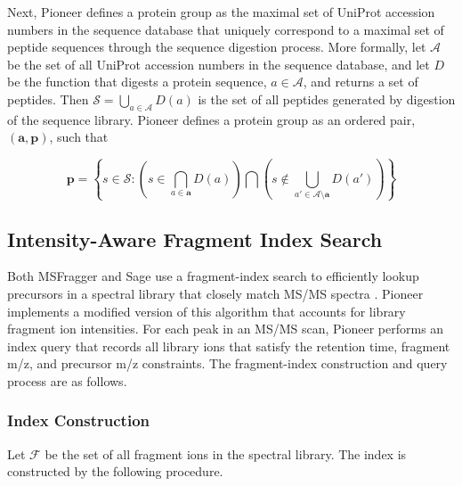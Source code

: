 \documentclass[pdflatex,sn-nature]{sn-jnl}
\begin{document}
Next, Pioneer defines a protein group as the maximal set of UniProt accession numbers in the sequence database that uniquely correspond to a maximal set of peptide sequences through the sequence digestion process. More formally, let $\mathcal{A}$ be the set of all UniProt accession numbers in the sequence database, and let $D$ be the function that digests a protein sequence, $a \in \mathcal{A}$, and returns a set of peptides. Then $\mathcal{S} = {\bigcup_{a \in \mathcal{A}} D(a)}$ is the set of all peptides generated by digestion of the sequence library. Pioneer defines a protein group as an ordered pair, $(\mathbf{a}, \mathbf{p})$, such that

\begin{equation}
\mathbf{p} = \left\{s 
\in \mathcal{S} : \left( s \in \bigcap_{a \in \mathbf{a}} D(a)\right) \bigcap \left(s \notin \bigcup_{a' \in \mathcal{A}\setminus\mathbf{a}} D(a') \right)\right\}
\end{equation}

\subsection{Intensity-Aware Fragment Index Search}\label{subsec3}

Both MSFragger and Sage use a fragment-index search to efficiently lookup precursors in a spectral library that closely match MS/MS spectra \cite{Kong2017-gg,Lazear2023-ci}. Pioneer implements a modified version of this algorithm that accounts for library fragment ion intensities. For each peak in an MS/MS scan, Pioneer performs an index query that records all library ions that satisfy the retention time, fragment m/z, and precursor m/z constraints. The fragment-index construction and query process are as follows.

\subsubsection{Index Construction}
Let $\mathcal{F}$ be the set of all fragment ions in the spectral library. The index is constructed by the following procedure.
\end{document}
